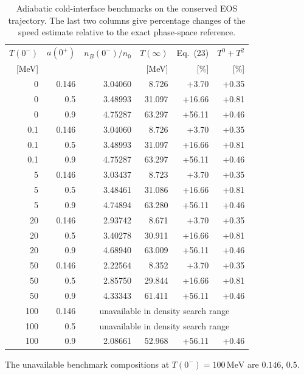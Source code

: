 \begin{table}[tbp]
\centering
\caption{Adiabatic cold-interface benchmarks on the conserved EOS trajectory.
The last two columns give percentage changes of the speed estimate relative to the exact phase-space reference.}
\label{tab:adiabatic-speed}
\begin{tabular}{rrrrrr}
\toprule
\(T(0^-)\) & \(a(0^+)\) & \(n_B(0^-)/n_0\) & \(T(\infty)\) & Eq.~(23) & \(T^0+T^2\)\\
{[MeV]} & & & {[MeV]} & {[\%]} & {[\%]}\\
\midrule
0 & 0.146 & 3.04060 & 8.726 & +3.70 & +0.35 \\
0 & 0.5 & 3.48993 & 31.097 & +16.66 & +0.81 \\
0 & 0.9 & 4.75287 & 63.297 & +56.11 & +0.46 \\
0.1 & 0.146 & 3.04060 & 8.726 & +3.70 & +0.35 \\
0.1 & 0.5 & 3.48993 & 31.097 & +16.66 & +0.81 \\
0.1 & 0.9 & 4.75287 & 63.297 & +56.11 & +0.46 \\
5 & 0.146 & 3.03437 & 8.723 & +3.70 & +0.35 \\
5 & 0.5 & 3.48461 & 31.086 & +16.66 & +0.81 \\
5 & 0.9 & 4.74894 & 63.280 & +56.11 & +0.46 \\
20 & 0.146 & 2.93742 & 8.671 & +3.70 & +0.35 \\
20 & 0.5 & 3.40278 & 30.911 & +16.66 & +0.81 \\
20 & 0.9 & 4.68940 & 63.009 & +56.11 & +0.46 \\
50 & 0.146 & 2.22564 & 8.352 & +3.70 & +0.35 \\
50 & 0.5 & 2.85750 & 29.844 & +16.66 & +0.81 \\
50 & 0.9 & 4.33343 & 61.411 & +56.11 & +0.46 \\
100 & 0.146 & \multicolumn{4}{c}{unavailable in density search range}\\
100 & 0.5 & \multicolumn{4}{c}{unavailable in density search range}\\
100 & 0.9 & 2.08661 & 52.968 & +56.11 & +0.46 \\
\bottomrule
\end{tabular}
\end{table}
The unavailable benchmark compositions at \(T(0^-)=100\,\mathrm{MeV}\) are \(0.146\), \(0.5\).
